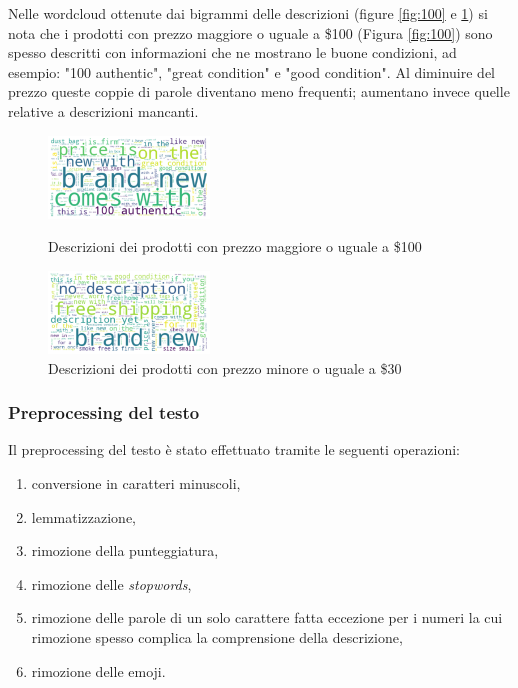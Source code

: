 \begin{itemize}
Nelle wordcloud ottenute dai bigrammi delle descrizioni (figure
\ref{fig:100} e \ref{Fig:minore_30}) si nota
che i prodotti con prezzo maggiore o uguale a \$100 (Figura \ref{fig:100}) sono
spesso descritti con informazioni che ne mostrano le buone condizioni, ad
esempio: "100 authentic", "great condition" e "good condition". Al diminuire del
prezzo queste coppie di parole diventano meno frequenti; aumentano invece quelle
relative a descrizioni mancanti.

\end{itemize}

\begin{figure}[H]
  \begin{minipage}{0.48\textwidth}
    \centering
    \includegraphics[height=2.2cm, keepaspectratio]{maggiore_100}
    \caption{Descrizioni dei prodotti con prezzo maggiore o uguale a \$100}
    \label{fig:100}
  \end{minipage}\hfill
  \begin{minipage}{0.48\textwidth}
    \centering
    \includegraphics[height=2.2cm, keepaspectratio]{minore_30}
    \caption{Descrizioni dei prodotti con prezzo minore o uguale a \$30}
    \label{Fig:minore_30}
  \end{minipage}
\end{figure}


\subsubsection{Preprocessing del testo}

Il preprocessing del testo è stato effettuato tramite le seguenti operazioni:
\begin{enumerate}
  \itemsep0em 
  \item conversione in caratteri minuscoli,
  \item lemmatizzazione,
  \item rimozione della punteggiatura,
  \item rimozione delle \textit{stopwords},
  \item rimozione delle parole di un solo carattere fatta eccezione per i
        numeri la cui rimozione spesso complica la comprensione della descrizione,
  \item rimozione delle emoji.
\end{enumerate}

